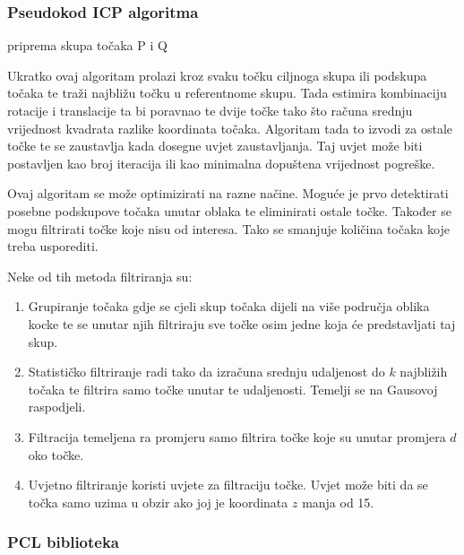 \subsubsection{Pseudokod ICP algoritma}

\begin{algorithm}[h!]
\SetAlgoLined
{}
 priprema skupa točaka P i Q\;
\end{algorithm}

Ukratko ovaj algoritam prolazi kroz svaku točku ciljnoga skupa ili podskupa točaka te traži najbližu točku u referentnome skupu. Tada estimira kombinaciju rotacije i translacije ta bi poravnao te dvije točke tako što računa srednju vrijednost kvadrata razlike koordinata točaka. Algoritam tada to izvodi za ostale točke te se zaustavlja kada dosegne uvjet zaustavljanja. Taj uvjet može biti postavljen kao broj iteracija ili kao minimalna dopuštena vrijednost pogreške.

Ovaj algoritam se može optimizirati na razne načine. Moguće je prvo detektirati posebne podskupove točaka unutar oblaka te eliminirati ostale točke. Također se mogu filtrirati točke koje nisu od interesa. Tako se smanjuje količina točaka koje treba usporediti.

Neke od tih metoda filtriranja su:
\begin{enumerate}
  \item Grupiranje točaka gdje se cjeli skup točaka dijeli na više područja oblika kocke te se unutar njih filtriraju sve točke osim jedne koja će predstavljati taj skup.
  \item Statističko filtriranje radi tako da izračuna srednju udaljenost do $k$ najbližih točaka te filtrira samo točke unutar te udaljenosti. Temelji se na Gausovoj raspodjeli.
  \item Filtracija temeljena ra promjeru samo filtrira točke koje su unutar promjera $d$ oko točke.
  \item Uvjetno filtriranje koristi uvjete za filtraciju točke. Uvjet može biti da se točka samo uzima u obzir ako joj je koordinata $z$ manja od 15.
\end{enumerate}

\pagebreak
\subsubsection{PCL biblioteka}

